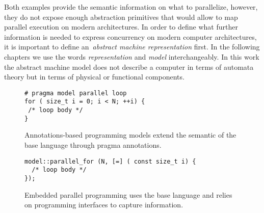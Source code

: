 Both examples provide the semantic information on what to parallelize, however, they do not expose enough abstraction primitives that would allow to map parallel execution on modern architectures. In order to define what further information is needed to express concurrency on modern computer architectures, it is important to define an~\emph{abstract machine representation} first. In the following chapters we use the words \emph{representation} and \emph{model} interchangeably. In this work the abstract machine model does not describe a computer in terms of automata theory but in terms of physical or functional components.

\begin{figure}
\begin{Verbatim}[frame=leftline]
# pragma model parallel loop
for ( size_t i = 0; i < N; ++i) {
 /* loop body */
}
\end{Verbatim}
\caption{Annotations-based programming models extend the semantic of the base language through pragma annotations.}
\label{figOMPLike}
\end{figure}

\begin{figure}
\begin{Verbatim}[frame=leftline]
model::parallel_for (N, [=] ( const size_t i) {
  /* loop body */
});
\end{Verbatim}
\caption{Embedded parallel programming uses the base language and relies on programming interfaces to capture information.}
\label{figKokkosLike}
\end{figure}
